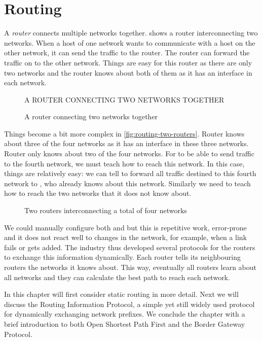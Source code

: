 \chapter{Routing}
\label{chap:routing}

A \emph{router} connects multiple networks together.
 shows a router in\-ter\-con\-nect\-ing two networks.
When a host of one network wants to communicate with a host on the other network, it can send the traffic to the router.
The router can forward the traffic on to the other network.
Things are easy for this router as there are only two networks and the router knows about both of them as it has an interface in each network.


\begin{figure}
   \centering
   A ROUTER CONNECTING TWO NETWORKS TOGETHER
   \caption{A router connecting two networks together}
   \label{fig:routing-basic}
\end{figure}

Things become a bit more complex in \vref{fig:routing-two-routers}.
Router  knows about three of the four networks as it has an interface in these three networks.
Router  only knows about two of the four networks.
For  to be able to send traffic to the fourth network, we must teach  how to reach this network.
In this case, things are relatively easy: we can tell  to forward all traffic destined to this fourth network to , who already knows about this network.
Similarly we need to teach  how to reach the two networks that it does not know about.


\begin{figure}
   \centering
   \caption{Two routers interconnecting a total of four networks}
   \label{fig:routing-two-routers}
\end{figure}


We could manually configure both  and  but this is repetitive work, error-prone and it does not react well to changes in the network, for example, when a link fails or gets added.
The industry thus developed several protocols for the routers to exchange this information dynamically.
Each router tells its neighbouring routers the networks it knows about.
This way, eventually all routers learn about all networks and they can calculate the best path to reach each network.

In this chapter will first consider static routing in more detail.
Next we will discuss the Routing Information Protocol, a simple yet still widely used protocol for dynamically exchanging network prefixes.
We conclude the chapter with a brief introduction to both Open Shortest Path First and the Border Gateway Protocol.



